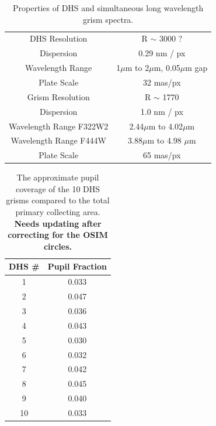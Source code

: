 \documentclass{emulateapj}
\newcommand{\DHSres}{3000 ?}
\begin{document}
\begin{table}
\centering
\begin{tabular}{cc}
DHS  Resolution &  R $\sim$ \DHSres \\
Dispersion & 0.29 nm / px \\
Wavelength Range & 1$\mu$m to 2$\mu$m, 0.05$\mu$m gap \\
Plate Scale & 32 mas/px \\
\hline \hline
Grism Resolution & R $\sim$ 1770 \\
Dispersion & 1.0 nm / px  \\
Wavelength Range F322W2 & 2.44$\mu$m to 4.02$\mu$m \\
Wavelength Range F444W & 3.88$\mu$m to 4.98 $\mu$m \\
Plate Scale & 65 mas/px \\
\end{tabular}
\caption{Properties of DHS and simultaneous long wavelength grism spectra.}\label{tab:DHSgprop}
\end{table}


\begin{table}
\centering
\begin{tabular}{cc}
DHS \# & Pupil Fraction \\
\hline \hline
1 & 0.033 \\
2 & 0.047 \\
3 & 0.036 \\
4 & 0.043 \\
5 & 0.030 \\
6 & 0.032 \\
7 & 0.042 \\
8 & 0.045 \\
9 & 0.040 \\
10 & 0.033 \\
\end{tabular}
\caption{The approximate pupil coverage of the 10 DHS grisms compared to the total primary collecting area. \textbf{Needs updating after correcting for the OSIM circles.}}\label{tab:pupfrac}
\end{table}
\end{document}
